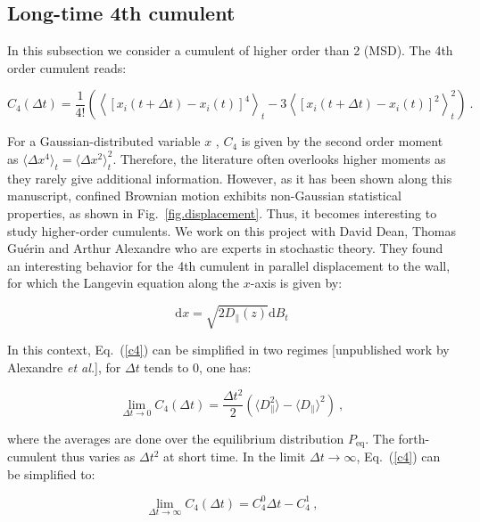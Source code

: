 {\subsection{Long-time 4th cumulent}

In this subsection we consider a cumulent of higher order than 2 (\gls{MSD}). The 4th order cumulent reads:

\begin{equation}
	C_4 (\Delta t) = \frac{1}{4!} \left(
	\left\langle [ x_i(t + \Delta t) - x_i(t) ]^4 \right\rangle_t
	- 3\left\langle [ x_i(t + \Delta t) - x_i(t) ]^2 \right\rangle_t ^2
	\right) ~.
	\label{c4}
\end{equation}

For a Gaussian-distributed variable $x$ , $C_4$ is given by the second order moment as $ \langle \Delta x^4 \rangle_t  = \langle \Delta x ^2 \rangle _t ^2 $. Therefore, the literature often overlooks higher moments as they rarely give additional information. However, as it has been shown along this manuscript, confined Brownian motion exhibits non-Gaussian statistical properties, as shown in Fig.~\ref{fig.displacement}. Thus, it becomes interesting to study higher-order cumulents. We work on this project with David Dean, Thomas Guérin and Arthur Alexandre who are experts in stochastic theory. They found an interesting behavior for the 4th cumulent in parallel displacement to the wall, for which the Langevin equation along the $x$-axis is given by:

\begin{equation}
	\mathrm{d}x = \sqrt{2D_\parallel(z)} \mathrm{d}B_t
	\label{c4.dx}
\end{equation}

In this context, Eq.~(\ref{c4}) can be simplified in two regimes [unpublished work by Alexandre \textit{et al.}], for $\Delta t $ tends to $0$, one has:

\begin{equation}
	\lim\limits_{\Delta t \rightarrow 0 } C_4 (\Delta t) = \frac{\Delta t ^2}{2}
	\left(
	\langle D_\parallel ^2 \rangle - \langle D _\parallel \rangle ^2 
	\right)~,
	\label{c4short}
\end{equation}

where the averages are done over the equilibrium distribution $P_\mathrm{eq}$. The forth-cumulent thus varies as $\Delta t ^2$ at short time. In the limit $\Delta t \rightarrow \infty$, Eq.~(\ref{c4}) can be simplified to:

\begin{equation}
	\lim\limits_{\Delta t \rightarrow \infty } C_4 (\Delta t) = C_4 ^0 \Delta t - C^1 _4 ~,
\end{equation}

}
